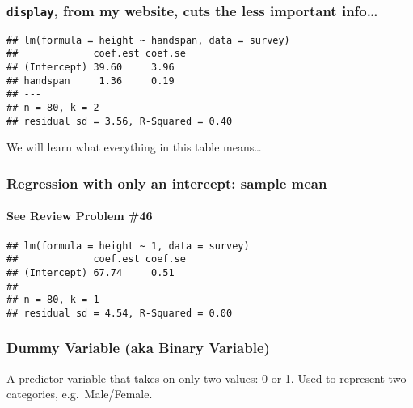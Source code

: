 \begin{frame}[fragile]
  \frametitle{\texttt{display}, from my website, cuts the less important info\dots} 
  \small
\begin{knitrout}
\color{fgcolor}\begin{kframe}
\begin{alltt}
\hlstd{(}\hlstd{)}
\end{alltt}
\begin{verbatim}
## lm(formula = height ~ handspan, data = survey)
##             coef.est coef.se
## (Intercept) 39.60     3.96  
## handspan     1.36     0.19  
## ---
## n = 80, k = 2
## residual sd = 3.56, R-Squared = 0.40
\end{verbatim}
\end{kframe}
\end{knitrout}
\alert{We will learn what everything in this table means\dots}
\end{frame}
\begin{frame}[fragile]
  \frametitle{Regression with only an intercept: sample mean}
  \framesubtitle{See Review Problem \#46}
\begin{knitrout}
\color{fgcolor}\begin{kframe}
\begin{alltt}
 \hlkwb{<-}  \hlopt{~} \hlstd{,}  
\end{alltt}
\begin{verbatim}
## lm(formula = height ~ 1, data = survey)
##             coef.est coef.se
## (Intercept) 67.74     0.51  
## ---
## n = 80, k = 1
## residual sd = 4.54, R-Squared = 0.00
\end{verbatim}
\end{kframe}
\end{knitrout}
\end{frame}
\begin{frame}
\frametitle{Dummy Variable (aka Binary Variable)}
 
A predictor variable that takes on only two values: 0 or 1. Used to represent two categories, e.g.\ Male/Female.
\end{frame}

